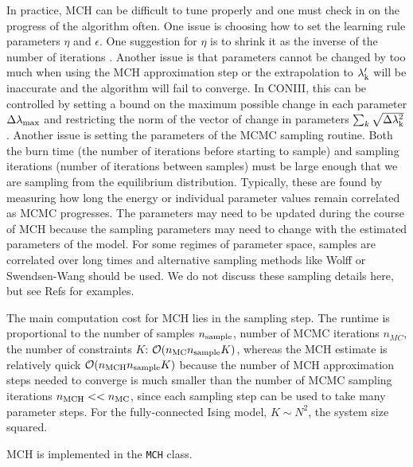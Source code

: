 \documentclass[aps,prl,twocolumn,nofootinbib]{revtex4-1}
\begin{document}
In practice, MCH can be difficult to tune properly and one must check in on the progress of the algorithm often. One issue is choosing how to set the learning rule parameters $\eta$ and $\epsilon$. One suggestion for $\eta$ is to shrink it as the inverse of the number of iterations \cite{Tkacik:2006vq}. Another issue is that parameters cannot be changed by too much when using the MCH approximation step or the extrapolation to $\lambda_{\rm k}'$ will be inaccurate and the algorithm will fail to converge. In CONIII, this can be controlled by setting a bound on the maximum possible change in each parameter  $\Delta\lambda_{\rm max}$ and restricting the norm of the vector of change in parameters $\sum_k \sqrt{\Delta\lambda_{\rm k}^2}$. Another issue is setting the parameters of the MCMC sampling routine. Both the burn time (the number of iterations before starting to sample) and sampling iterations (number of iterations between samples) must be large enough that we are sampling from the equilibrium distribution.  Typically, these are found by measuring how long the energy or individual parameter values remain correlated as MCMC progresses. The parameters may need to be updated during the course of MCH because the sampling parameters may need to change with the estimated parameters of the model. For some regimes of parameter space, samples are correlated over long times and alternative sampling methods like Wolff or Swendsen-Wang should be used.
We do not discuss these sampling details here, but see Refs \cite{MacKay:2005wc,Newman:1999wu} for examples.

The main computation cost for MCH lies in the sampling step. The runtime is proportional to the number of samples $n_{\rm sample}$, number of MCMC iterations $n_{MC}$, the number of constraints $K$:
$\mathcal{O}(n_{\rm MC} n_{\rm sample} K)$, whereas the MCH estimate is relatively quick $\mathcal{O}(n_{\rm MCH} n_{\rm sample}K)$ because the number of MCH approximation steps needed to converge is much smaller than the number of MCMC sampling iterations $n_{\rm MCH}<<n_{\rm MC}$, since each sampling step can be used to take many parameter steps.
For the fully-connected Ising model, $K\sim N^2$, the system size squared.

MCH is implemented in the {\tt MCH} class.
\end{document}
